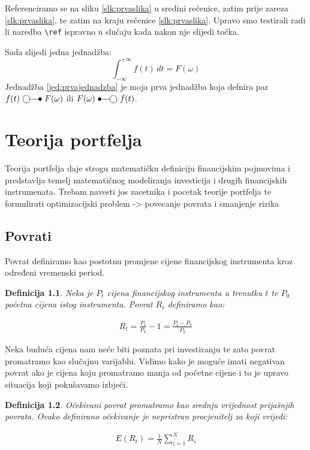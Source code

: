 \documentclass[zavrsnirad]{fer}
\newtheorem{definition}{Definicija}
\begin{document}
Referenciramo se na sliku \ref{slk:prvaslika} u sredini rečenice, zatim prije zareza \ref{slk:prvaslika}, te zatim na kraju rečenice \ref{slk:prvaslika}.
Upravo smo testirali radi li naredba \verb|\ref| ispravno u slučaju kada nakon nje slijedi točka.

Sada slijedi jedna jednadžba:
\begin{equation}
  \label{jed:prvajednadzba}
  \int_{-\infty}^{+\infty}f(t)\,dt=F(\omega)
\end{equation}
Jednadžba \eqref{jed:prvajednadzba} je moja prva jednadžba koja defnira par $f(t)\ufrek F(\omega)$ ili $F(\omega)\uvrem f(t)$.

\chapter{Teorija portfelja}
\label{pog:teorija_portelja}

Teorija portfelja daje strogu matematičku definiciju
financijskim pojmovima i predstavlja temelj matematičnog
modeliranja investicija i drugih financijskih instrumenata.
Trebam navesti jos zacetnika i pocetak teorije portfelja te formulirati
optimizacijski problem -> povecanje povrata i smanjenje rizika

\section{Povrati}
\label{sek:povrati}

Povrat definiramo kao postotnu promjene cijene financijskog
instrumenta kroz određeni vremenski period.

\begin{definition}
  Neka je $P_t$ cijena financijskog instrumenta u trenutku $t$ te
  $P_0$ početna cijena istog instrumenta. Povrat $R_t$ definiramo kao:
\end{definition}
\begin{align*}R_t = \frac{P_t}{P_0} - 1 = \frac{P_t - P_0}{P_0}
\end{align*}

\noindent Neka buduća cijena nam neće biti poznata pri investiranju te zato povrat promatramo kao slučajnu varijablu.
Vidimo kako je moguće imati negativan povrat ako je cijena koju promatramo
manja od početne cijene i to je upravo situacija koji pokušavamo izbjeći.
\begin{definition}
  Očekivani povrat promatramo kao srednju vrijednost prijašnjih
  povrata. Ovako definirano očekivanje je nepristran procjenitelj
  za koji vrijedi:
\end{definition}
\begin{align*}
  E(R_t) =\frac{1}{N} \sum_{i = 1}^{N} R_i
\end{align*}
\end{document}
